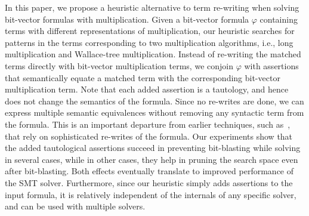 In this paper, we propose a heuristic alternative to term re-writing
when solving bit-vector formulas with multiplication.  Given a
bit-vector formula $\varphi$ containing terms with different
representations of multiplication, our heuristic searches for patterns
in the terms corresponding to two multiplication algorithms, i.e.,
long multiplication and Wallace-tree multiplication. Instead of
re-writing the matched terms directly with bit-vector multiplication
terms, we conjoin $\varphi$ with assertions that semantically equate a
matched term with the corresponding bit-vector multiplication term.
Note that each added assertion is a tautology, and hence does not
change the semantics of the formula.  Since no re-writes are done, we
can express multiple semantic equivalences without removing any
syntactic term from the formula.  This is an important departure from
earlier techniques, such as~\cite{kolbl}, that rely on sophisticated
re-writes of the formula. Our experiments show that the added
tautological assertions succeed in preventing bit-blasting while
solving in several cases, while in other cases, they help in pruning
the search space even after bit-blasting.  Both effects eventually
translate to improved performance of the SMT solver.  Furthermore,
since our heuristic simply adds assertions to the input formula, it is
relatively independent of the internals of any specific solver, and
can be used with multiple solvers. %



%

